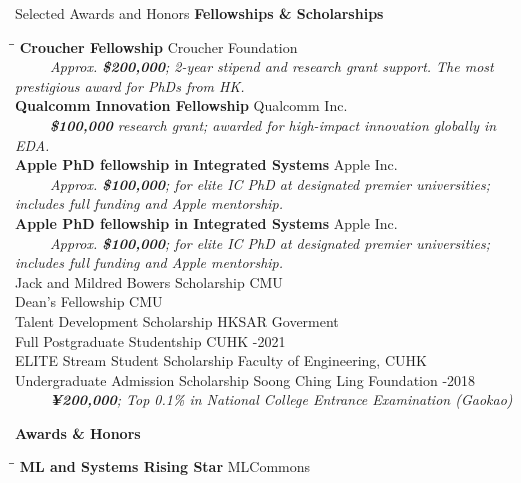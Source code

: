 
\begin{rSection}{Selected Awards and Honors}
{\bf{\textcolor{CUHKblue}{Fellowships \& Scholarships}}}
\vspace{-0.6em}
\begin{tabbing}
\hspace{3.6in}\= \hspace{2.6in}\= \kill
\textbf{Croucher Fellowship } \> Croucher Foundation  \\
{~ ~ ~ \small \textit{Approx. \textbf{\$200,000}; 2-year stipend and research grant support. The most prestigious award for PhDs from HK.}}\\
\textbf{Qualcomm Innovation Fellowship} \> Qualcomm Inc.  \\
{~ ~ ~ \small  \textit{\textbf{\$100,000} research grant; awarded for high-impact innovation globally in EDA.}} \\
\textbf{Apple PhD fellowship in Integrated Systems} \> Apple Inc.  \\
{~ ~ ~ \small \textit{Approx. \textbf{\$100,000}; for elite IC PhD at designated premier universities; includes full funding and Apple mentorship.}} \\
\textbf{Apple PhD fellowship in Integrated Systems} \> Apple Inc.  \\
{~ ~ ~ \small \textit{Approx. \textbf{\$100,000}; for elite IC PhD at designated premier universities; includes full funding and Apple mentorship.}} \\
Jack and Mildred Bowers Scholarship \> CMU  \\
{Dean's Fellowship} \> CMU  \\
Talent Development Scholarship \> HKSAR Goverment  \\
{Full Postgraduate Studentship}   \>CUHK  -2021\\
    ELITE Stream Student Scholarship                \> Faculty of Engineering, CUHK                             \\
    {Undergraduate Admission Scholarship}                             \> Soong Ching Ling Foundation  -2018 \\
    {~ ~ ~ \small \textit{ \textbf{¥200,000}; Top 0.1\% in National College Entrance Examination (Gaokao)}} 
\end{tabbing}

{\bf{\textcolor{CUHKblue}{Awards \& Honors}}}
\vspace{-0.6em}
\begin{tabbing}
\hspace{3.6in}\= \hspace{2.6in}\= \kill
\textbf{ML and Systems Rising Star}  \> MLCommons   \\


\end{tabbing}
\end{rSection}
